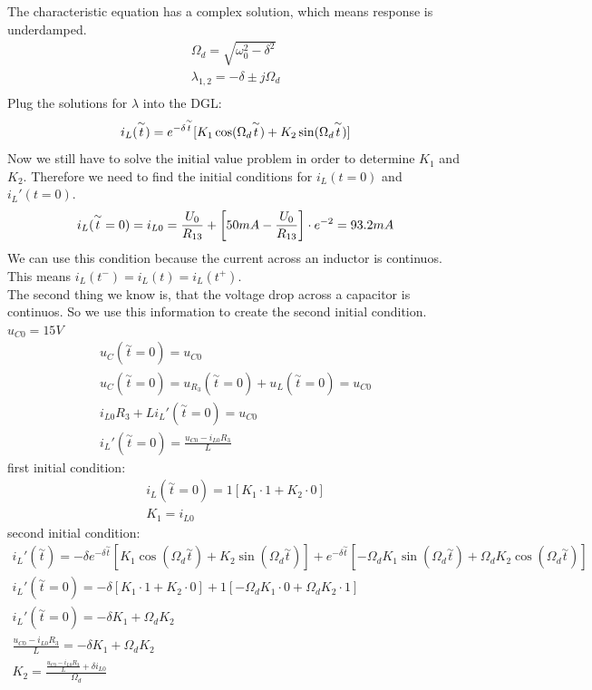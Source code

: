 \documentclass[a4paper]{article}
\begin{document}
The characteristic equation has a complex solution, which means response is underdamped.
\begin{align*}
	\Omega_d = \sqrt{\omega_0^2 - \delta^2}\\
	\lambda_{1,2} = -\delta \pm j\Omega_d\\
\end{align*}
Plug the solutions for $\lambda$ into the DGL:
\begin{equation*}
	i_L(\overset{\sim }{t}) = e^{-\delta \overset{\sim }{t}}[K_1\cos(\Omega_d\overset{\sim }{t}) + K_2\sin(\Omega_d\overset{\sim }{t})]\\
\end{equation*}
Now we still have to solve the initial value problem in order to determine $K_1$ and $K_2$.
Therefore we need to find the initial conditions for $i_L(t = 0)$ and $i_L'(t = 0)$.
\begin{equation*}
	i_L(\overset{\sim }{t} = 0) = i_{L0} = \frac{U_0}{R_{13}} + \left[50mA - \frac{U_0}{R_{13}}
	\right] \cdot e^{-2} = 93.2mA\\
\end{equation*}
We can use this condition because the current across an inductor is continuos. This means $i_L(t^-) = i_L(t) = i_L(t^+)$.\\
\pagebreak
The second thing we know is, that the voltage drop across a capacitor is continuos. So we use this
information to create the second initial condition. $u_{C0}=15V$
\begin{align*}
	u_C(\overset{\sim }{t} = 0) = u_{C0}\\
	u_C(\overset{\sim }{t} = 0) = u_{R_3}(\overset{\sim }{t} = 0) + u_L(\overset{\sim }{t} = 0)
	= u_{C0}\\
	i_{L0}R_3 + Li_L'(\overset{\sim }{t} = 0) = u_{C0}\\
	i_L'(\overset{\sim }{t} = 0) = \frac{u_{C0}- i_{L0}R_3}{L}
\end{align*}
first initial condition:
\begin{align*}
	i_L(\overset{\sim }{t} = 0) = 1[K_1 \cdot 1 + K_2\cdot 0]\\
	K_1 = i_{L0}
\end{align*}
second initial condition:
\begin{align*}
	i_L'(\overset{\sim }{t}) = -\delta e^{-\delta \overset{\sim }{t}}[K_1\cos(\Omega_d\overset{\sim }{t}) + K_2\sin(\Omega_d\overset{\sim }{t})] +
	 e^{-\delta \overset{\sim }{t}}[-\Omega_dK_1\sin(\Omega_d\overset{\sim }{t}) + \Omega_dK_2\cos(\Omega_d\overset{\sim }{t})]\\
	i_L'(\overset{\sim }{t}=0) = -\delta [K_1 \cdot 1 + K_2 \cdot 0] + 1[-\Omega_dK_1\cdot 0 + \Omega_dK_2\cdot 1]\\
	i_L'(\overset{\sim }{t}=0) = -\delta K_1 + \Omega_dK_2\\
	\frac{u_{C0} - i_{L0}R_3}{L} = -\delta K_1 + \Omega_dK_2\\
	K_2 = \frac{\frac{u_{C0} - i_{L0}R_3}{L} + \delta i_{L0}}{\Omega_d}
\end{align*}
\end{document}
